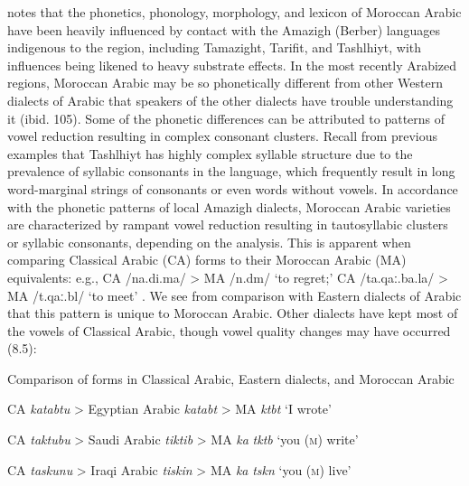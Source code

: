   \citet{Chtatou1997} notes that the phonetics, phonology, morphology, and lexicon of Moroccan Arabic have been heavily influenced by contact with the Amazigh (Berber) languages indigenous to the region, including Tamazight, Tarifit, and Tashlhiyt, with influences being likened to heavy substrate effects. In the most recently Arabized regions, Moroccan Arabic may be so phonetically different from other Western dialects of Arabic that speakers of the other dialects have trouble understanding it (ibid. 105). Some of the phonetic differences can be attributed to patterns of vowel reduction resulting in complex consonant clusters. Recall from previous examples that Tashlhiyt has highly complex syllable structure due to the prevalence of syllabic consonants in the language, which frequently result in long word-marginal strings of consonants or even words without vowels. In accordance with the phonetic patterns of local Amazigh dialects, Moroccan Arabic varieties are characterized by rampant vowel reduction resulting in tautosyllabic clusters or syllabic consonants, depending on the analysis. This is apparent when comparing Classical Arabic (CA) forms to their Moroccan Arabic (MA) equivalents: e.g., CA /na.di.ma/ > MA /n.dm/ ‘to regret;’ CA /ta.qaː.ba.la/ > MA /t.qaː.bl/ ‘to meet’ \citep[110]{Chtatou1997}. We see from comparison with Eastern dialects of Arabic that this pattern is unique to Moroccan Arabic. Other dialects have kept most of the vowels of Classical Arabic, though vowel quality changes may have occurred (8.5):



\ea\label{ex:(8.5)}
  Comparison of forms in Classical Arabic, Eastern dialects, and Moroccan Arabic



  CA \textit{katabtu} > Egyptian Arabic \textit{katabt} > MA \textit{ktbt} ‘I wrote’ 



  CA \textit{taktubu} > Saudi Arabic \textit{tiktib} > MA \textit{ka} \textit{tktb} ‘you (\textsc{m}) write’



  CA \textit{taskunu} > Iraqi Arabic \textit{tiskin} > MA \textit{ka} \textit{tskn} ‘you (\textsc{m}) live’



\citep[111-12]{Chtatou1997}

\z


